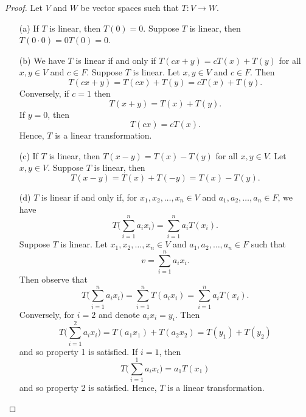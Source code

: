 \begin{proof}
    Let \( V  \) and \( W  \) be vector spaces such that \( T: V \to W  \).
\begin{enumerate}
    \item[(a)] If \( T  \) is linear, then \( T(0) = 0  \).
        Suppose \( T  \) is linear, then \( T(0 \cdot 0 ) = 0 T(0) = 0  \).
    \item[(b)] \label{Second Property of Linearity} We have \( T  \) is linear if and only if \( T(cx+y) = cT(x) + T(y)  \) for all \( x,y \in V  \) and \( c \in F  \).
        Suppose \( T  \) is linear. Let \( x,y \in V  \) and \( c \in F  \). Then 
        \[  T(cx+y) = T(cx) + T(y) = cT(x) + T(y). \]
        Conversely, if \( c = 1  \) then 
        \[  T(x + y) = T(x) + T(y). \]
        If  \( y = 0  \), then 
        \[ T(cx) = cT(x).  \]
        Hence, \( T  \) is a linear transformation.
    \item[(c)] If \( T  \) is linear, then \( T(x-y) = T(x) - T(y)  \) for all \( x,y \in V  \).
        Let \( x,y \in V  \). Suppose \( T  \) is linear, then 
        \[ T(x - y) = T(x) + T(-y) = T(x) - T(y).  \]
    \item[(d)] \( T  \) is linear if and only if, for \( x_{1}, x_{2} , \dots, x_{n} \in V  \) and \( a_{1}, a_{2}, \dots, a_{n} \in F  \), 
        we have
        \[  T \Big(  \sum_{ i=1 }^{ n } a_{i} x_{i}  \Big) = \sum_{ i=1 }^{ n } a_{i} T(x_{i}). \]
        Suppose \( T  \) is linear. Let \( x_{1}, x_{2}, \dots, x_{n} \in V  \) and \( a_{1}, a_{2}, \dots, a_{n} \in F  \) such that
        \[  v = \sum_{ i=1 }^{ n } a_{i} x_{i}. \]
        Then observe that 
        \[
            T \Big( \sum_{ i=1 }^{ n } a_{i} x_{i} \Big) = \sum_{ i=1 }^{ n } T( a_{i} x_{i}) 
                                                         = \sum_{ i=1 }^{ n } a_{i} T(x_{i}).
        \]
        Conversely, for \( i = 2  \) and denote \( a_{i} x_{i} = y_{i} \). Then
        \[  T\Big(\sum_{ i=1 }^{ 2 } a_{i} x_{i} \Big) = T(a_{1} x_{1}) + T(a_{2} x_{2}) = T(y_{1}) + T(y_{2})  \]  
        and so property 1 is satisfied. 
        If \( i = 1  \), then 
        \[  T \Big( \sum_{ i=1 }^{ 1 } a_{i}x_{i}  \Big) = a_{1} T(x_{1}) \]
        and so property 2 is satisfied. Hence, \( T  \) is a linear transformation.
\end{enumerate}
\end{proof}
